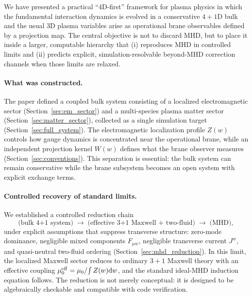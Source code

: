 \documentclass[11pt]{article}
\newcommand{\Z}{Z}              %
\newcommand{\W}{W}              %
\begin{document}
We have presented a practical ``4D-first'' framework for plasma physics in which the
fundamental interaction dynamics is evolved in a conservative \(4+1\)D bulk and the
usual \(3\)D plasma variables arise as operational brane observables defined by a
projection map. The central objective is not to discard MHD, but to place it inside a
larger, computable hierarchy that (i) reproduces MHD in controlled limits and (ii)
predicts explicit, simulation-resolvable beyond-MHD correction channels when those
limits are relaxed.

\paragraph{What was constructed.}
The paper defined a coupled bulk system consisting of a localized electromagnetic
sector (Section~\ref{sec:em_sector}) and a multi-species plasma matter sector
(Section~\ref{sec:matter_sector}), collected as a single simulation target
(Section~\ref{sec:full_system}). The electromagnetic localization profile \(\Z(w)\)
controls how gauge dynamics is concentrated near the operational brane, while an
independent projection kernel \(\W(w)\) defines what the brane observer measures
(Section~\ref{sec:conventions}). This separation is essential: the bulk system can
remain conservative while the brane subsystem becomes an open system with explicit
exchange terms.

\paragraph{Controlled recovery of standard limits.}
We established a controlled reduction chain
\[
\text{(bulk 4+1 system)}
\;\to\;
\text{(effective 3+1 Maxwell + two-fluid)}
\;\to\;
\text{(MHD)},
\]
under explicit assumptions that suppress transverse structure:
zero-mode dominance, negligible mixed components \(F_{\mu w}\), negligible transverse
current \(J^w\), and quasi-neutral two-fluid ordering (Section~\ref{sec:mhd_reduction}).
In this limit, the localized Maxwell sector reduces to ordinary \(3+1\) Maxwell theory
with an effective coupling \(\mu_0^{\rm eff}=\mu_0/\!\int \Z(w)\dd w\), and the standard
ideal-MHD induction equation follows. The reduction is not merely conceptual: it is
designed to be algebraically checkable and compatible with code verification.
\end{document}
